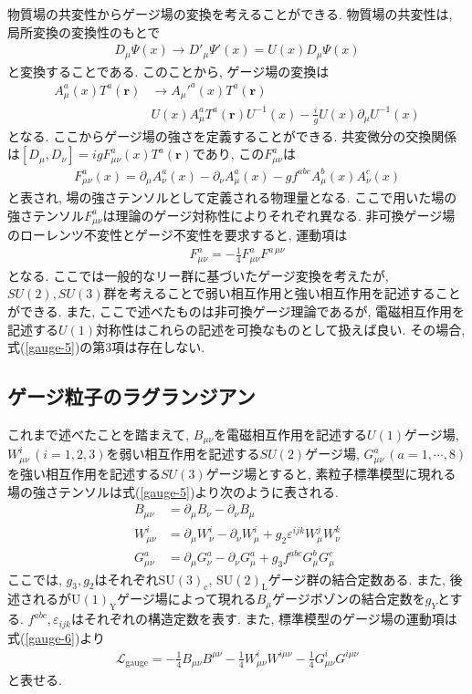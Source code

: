 物質場の共変性からゲージ場の変換を考えることができる.
物質場の共変性は, 局所変換の変換性のもとで
\begin{align}
  D_\mu\Psi(x) \rightarrow D'_\mu \Psi'(x) = U(x) D_\mu \Psi(x)\label{gauge-3}
\end{align}
と変換することである.
このことから, ゲージ場の変換は
\begin{align}
   A_\mu^a(x) T^a(\bm{r}) &\rightarrow A_\mu'^a(x) T^a(\bm{r})\nonumber\\
                          & U(x)A_\mu^a T^a(\bm{r}) U^{-1}(x) -\frac{i}{g}U(x)\partial_\mu U^{-1}(x) \label{gauge-4}
\end{align}
となる.
ここからゲージ場の強さを定義することができる.
共変微分の交換関係は$[D_\mu,D_\nu] = igF_{\mu\nu}^a(x)T^a(\bm{r})$であり, この$F_{\mu\nu}^a$は
\begin{align}
  F_{\mu\nu}^a(x) = \partial_\mu A_\nu^a(x) - \partial_\nu A_\mu^a(x) - gf^{abc}A_\mu^b(x)A_\nu^c(x)\label{gauge-5}
\end{align}
と表され, 場の強さテンソルとして定義される物理量となる.
ここで用いた場の強さテンソル$F_{\mu\nu}^a$は理論のゲージ対称性によりそれぞれ異なる.
非可換ゲージ場のローレンツ不変性とゲージ不変性を要求すると, 運動項は
\begin{align}
  F_{\mu\nu}^a = -\frac{1}{4}F_{\mu\nu}^a F^{a\,\mu\nu}\label{gauge-6}
\end{align}
となる.
ここでは一般的なリー群に基づいたゲージ変換を考えたが, $SU(2), SU(3)$群を考えることで弱い相互作用と強い相互作用を記述することができる.
また, ここで述べたものは非可換ゲージ理論であるが, 電磁相互作用を記述する$U(1)$対称性はこれらの記述を可換なものとして扱えば良い.
その場合, 式(\ref{gauge-5})の第3項は存在しない.
\subsection{ゲージ粒子のラグランジアン}
これまで述べたことを踏まえて, $B_{\mu\nu}$を電磁相互作用を記述する$U(1)$ゲージ場, $W_{\mu\nu}^i\,(i=1,2,3)$を弱い相互作用を記述する$SU(2)$ゲージ場, $G_{\mu\nu}^a\,(a=1,\cdots,8)$を強い相互作用を記述する$SU(3)$ゲージ場とすると, 素粒子標準模型に現れる場の強さテンソルは式(\ref{gauge-5})より次のように表される.
\begin{align}
  B_{\mu\nu} &= \partial_\mu B_\nu - \partial_\nu B_\mu \label{gauge.B}\\
  W_{\mu\nu}^i &= \partial_\mu W_\nu^i - \partial_\nu W_\mu^i+g_2\varepsilon^{ijk}W_\mu^j W_\nu^k \label{gauge.W}\\
  G_{\mu\nu}^a &= \partial_\mu G_\nu^a - \partial_\nu G_\mu^a +g_3 f^{abc}G_\mu^b G_\mu^c\label{gauge.G}
\end{align}
ここでは, $g_3, g_2$はそれぞれ$\mathrm{SU}(3)_\mathrm{c}$, $\mathrm{SU}(2)_\mathrm{L}$ゲージ群の結合定数ある.
また, 後述されるが$\mathrm{U(1)}_{\mathrm {Y}}$ゲージ場によって現れる$B_\mu$ゲージボゾンの結合定数を$g_Y$とする.
$f^{abc}, \varepsilon_{ijk} $はそれぞれの構造定数を表す.
また, 標準模型のゲージ場の運動項は式(\ref{gauge-6})より
\begin{align}
  \mathcal{L}_{\text{gauge}} = -\frac{1}{4}B_{\mu\nu} B^{\mu\nu} - \frac{1}{4}W_{\mu\nu}^i W^{i\mu\nu} -\frac{1}{4}G_{\mu\nu}^i G^{i\mu\nu}\label{gauge.kin}
\end{align}
と表せる.
